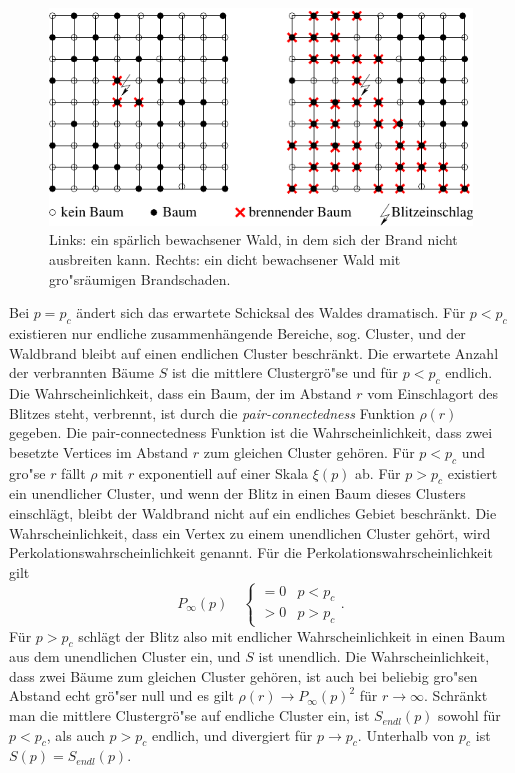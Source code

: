 \begin{figure}[tbp]
  \centering
  \includegraphics{./Einleitung-figs/waldbrand}
  \caption{Links: ein sp\"arlich bewachsener Wald, in dem sich der Brand nicht ausbreiten kann. Rechts: ein dicht bewachsener Wald mit gro"sr\"aumigen Brandschaden.}
  \label{fig:waldbrand}
\end{figure}
Bei $p=p_c$ \"andert sich das erwartete Schicksal des Waldes dramatisch. F\"ur $p<p_c$ existieren nur endliche zusammenh\"angende Bereiche, sog. Cluster, und der Waldbrand bleibt auf einen endlichen Cluster beschr\"ankt. Die erwartete Anzahl der verbrannten B\"aume $S$ ist die mittlere Clustergr\"o"se und f\"ur $p<p_c$ endlich. Die Wahrscheinlichkeit, dass ein Baum, der im Abstand $r$ vom Einschlagort des Blitzes steht, verbrennt, ist durch die  \textit{pair-connectedness} Funktion $\rho(r)$ gegeben. Die pair-connectedness Funktion ist die Wahrscheinlichkeit, dass zwei besetzte Vertices im Abstand $r$ zum gleichen Cluster geh\"oren. F\"ur $p<p_c$ und gro"se $r$ f\"allt $\rho$ mit $r$ exponentiell auf einer Skala $\xi(p)$ ab. F\"ur $p>p_c$ existiert ein unendlicher Cluster, und wenn der Blitz in einen Baum dieses Clusters einschl\"agt, bleibt der Waldbrand nicht auf ein endliches Gebiet beschr\"ankt. Die Wahrscheinlichkeit, dass ein Vertex zu einem unendlichen Cluster geh\"ort, wird Perkolationswahrscheinlichkeit genannt. F\"ur die Perkolationswahrscheinlichkeit gilt  
\begin{equation}
  P_{\infty}(p) \quad \begin{cases} =0 & p<p_c \\ >0 & p>p_c \end{cases}.
\end{equation}
F\"ur $p>p_c$ schl\"agt der Blitz also mit endlicher Wahrscheinlichkeit in einen Baum aus dem unendlichen Cluster ein, und $S$ ist unendlich. Die Wahrscheinlichkeit, dass zwei B\"aume zum gleichen Cluster geh\"oren, ist auch bei beliebig gro"sen Abstand echt gr\"o"ser null und es gilt $\rho(r) \rightarrow P_{\infty}(p)^2$ f\"ur $r\rightarrow \infty$. Schr\"ankt man die mittlere Clustergr\"o"se auf endliche Cluster ein, ist $S_{endl}(p)$ sowohl f\"ur $p<p_c$, als auch $p>p_c$ endlich, und divergiert f\"ur $p\rightarrow p_c$. Unterhalb von $p_c$ ist $S(p)=S_{endl}(p)$.\\
